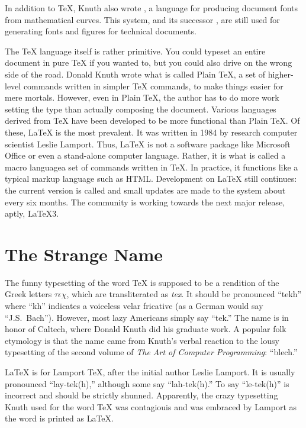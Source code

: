 In addition to \TeX{}, Knuth also wrote \MF{}, a language for
producing document fonts from mathematical curves.  This system, and
its successor \MP{}, are still used for generating fonts and figures
for technical documents.

The \TeX{} language itself is rather primitive.  You could typeset an
entire document in pure \TeX{} if you wanted to, but you could also
drive on the wrong side of the road.  Donald Knuth wrote what is
called Plain \TeX{}, a set of higher-level commands written in simpler
\TeX{} commands, to make things easier for mere mortals.  However,
even in Plain \TeX{}, the author has to do more work setting the type
than actually composing the document.  Various languages derived from
\TeX{} have been developed to be more functional than Plain \TeX{}.
Of these, \LaTeX{} is the most prevalent.  It was written in 1984 by
research computer scientist Leslie Lamport.  Thus, \LaTeX{} is not a
software package like Microsoft Office or even a stand-alone computer
language.  Rather, it is what is called a macro language\Dash{}a set of
commands written in \TeX{}.  In practice, it functions like a typical
markup language such as HTML\@.  Development on \LaTeX{} still
continues: the current version is called \LaTeXe{} and small updates
are made to the system about every six months.  The community is
working towards the next major release, aptly, \LaTeX{3}.

\section{The Strange Name}
\label{sec:strange-name}

The funny typesetting of the word \TeX{} is supposed to be a rendition
of the Greek letters $\tau \epsilon \chi$, which are transliterated as
\emph{tex}.  It should be pronounced ``tekh'' where ``kh'' indicates a
voiceless velar fricative (as a German would say ``J.S.\ Bach'').
However, most lazy Americans simply say ``tek.''  The name is in honor
of Caltech, where Donald Knuth did his graduate work.  A popular folk
etymology is that the name came from Knuth's verbal reaction to the
lousy typesetting of the second volume of \emph{The Art of Computer
  Programming}: ``blech.''

\LaTeX{} is for Lamport \TeX{}, after the initial author Leslie
Lamport.  It is usually pronounced ``lay-tek(h),'' although some say
``lah-tek(h).''  To say ``le-tek(h)'' is incorrect and should be
strictly shunned.  Apparently, the crazy typesetting Knuth used for
the word \TeX{} was contagiouis and was embraced by Lamport as the
word is printed as \LaTeX{}.

